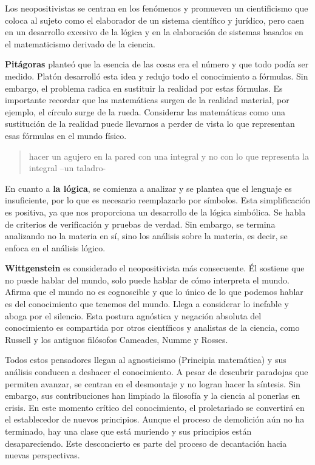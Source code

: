 \documentclass[
  letterpaper,
  DIV=11,
  numbers=noendperiod]{scrartcl}
\begin{document}
Los neopositivistas se centran en los fenómenos y promueven un
cientificismo que coloca al sujeto como el elaborador de un sistema
científico y jurídico, pero caen en un desarrollo excesivo de la lógica
y en la elaboración de sistemas basados en el matematicismo derivado de
la ciencia.

\textbf{Pitágoras} planteó que la esencia de las cosas era el número y
que todo podía ser medido. Platón desarrolló esta idea y redujo todo el
conocimiento a fórmulas. Sin embargo, el problema radica en sustituir la
realidad por estas fórmulas. Es importante recordar que las matemáticas
surgen de la realidad material, por ejemplo, el círculo surge de la
rueda. Considerar las matemáticas como una sustitución de la realidad
puede llevarnos a perder de vista lo que representan esas fórmulas en el
mundo físico.

\begin{quote}
hacer un agujero en la pared con una integral y no con lo que representa
la integral --un taladro-
\end{quote}

En cuanto a \textbf{la lógica}, se comienza a analizar y se plantea que
el lenguaje es insuficiente, por lo que es necesario reemplazarlo por
símbolos. Esta simplificación es positiva, ya que nos proporciona un
desarrollo de la lógica simbólica. Se habla de criterios de verificación
y pruebas de verdad. Sin embargo, se termina analizando no la materia en
sí, sino los análisis sobre la materia, es decir, se enfoca en el
análisis lógico.

\textbf{Wittgenstein} es considerado el neopositivista más consecuente.
Él sostiene que no puede hablar del mundo, solo puede hablar de cómo
interpreta el mundo. Afirma que el mundo no es cognoscible y que lo
único de lo que podemos hablar es del conocimiento que tenemos del
mundo. Llega a considerar lo inefable y aboga por el silencio. Esta
postura agnóstica y negación absoluta del conocimiento es compartida por
otros científicos y analistas de la ciencia, como Russell y los antiguos
filósofos Cameades, Numme y Rosses.

Todos estos pensadores llegan al agnosticismo (Principia matemática) y
sus análisis conducen a deshacer el conocimiento. A pesar de descubrir
paradojas que permiten avanzar, se centran en el desmontaje y no logran
hacer la síntesis. Sin embargo, sus contribuciones han limpiado la
filosofía y la ciencia al ponerlas en crisis. En este momento crítico
del conocimiento, el proletariado se convertirá en el establecedor de
nuevos principios. Aunque el proceso de demolición aún no ha terminado,
hay una clase que está muriendo y sus principios están desapareciendo.
Este desconcierto es parte del proceso de decantación hacia nuevas
perspectivas.
\end{document}
